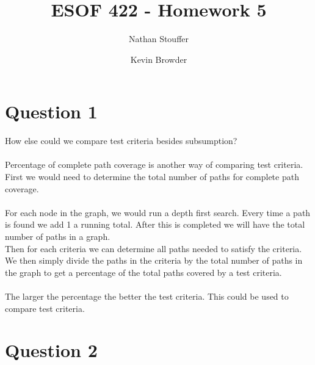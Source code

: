 \documentclass{article}
\begin{document}
\title{ESOF 422 - Homework 5}
\author{Nathan Stouffer \and Kevin Browder}

\maketitle
\newpage
\section*{Question 1}
How else could we compare test criteria besides subsumption? \\\\
Percentage of complete path coverage is another way of comparing test criteria. First we would need to determine the total number of paths for complete path coverage. \\\\
For each node in the graph, we would run a depth first search. Every time a path is found we add 1 a running total. After this is completed we will have the total number of paths in a graph. \\Then for each criteria we can determine all paths needed to satisfy the criteria. We then simply divide the paths in the criteria by the total number of paths in the graph to get a percentage of the total paths covered by a test criteria. \\\\
The larger the percentage the better the test criteria. This could be used to compare test criteria.  

\newpage
\section*{Question 2}
\end{document}
